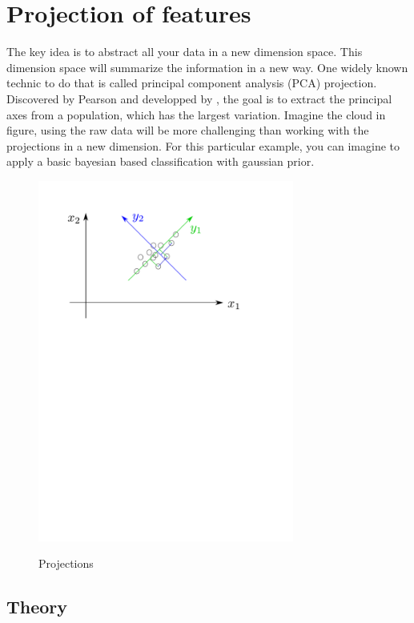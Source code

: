 \documentclass[runningheads,a4paper]{llncs}
\begin{document}
	\section{Projection of features}\label{theory}
	The key idea is to abstract all your data in a new dimension space. This dimension space will summarize the information in a new way. One widely known technic to do that is called principal component analysis (PCA) projection. Discovered by Pearson \cite{kpfrs1901lines} and developped by \cite{hotelling1933analysis}, the goal is to extract the principal axes from a population, which has the largest variation. Imagine the cloud in figure, using the raw data will be more challenging than working with the projections in a new dimension. For this particular example, you can imagine to apply a basic bayesian based classification with gaussian prior.
	
	\begin{figure}
		\centering
		\includegraphics[width=0.75\textwidth]{Figures/pcaProj}
		\\ \parbox{0.75\textwidth}{\caption[pcaProj]{Projections }\label{fig:pcaProj}} 
	\end{figure}
	\subsection{Theory}
	
\end{document}
